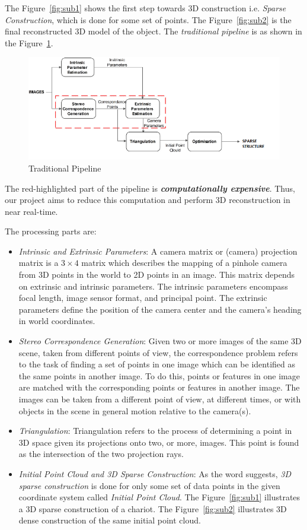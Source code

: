\documentclass{article}
\begin{document}
		The Figure~\ref{fig:sub1} shows the first step towards 3D construction i.e. \textit{Sparse Construction}, which is done for some set of points. The Figure~\ref{fig:sub2} is the final reconstructed 3D model of the object. The \textit{traditional pipeline} is as shown in the Figure~\ref{fig3}.

		\begin{figure}[ht!]
		\centering
		\includegraphics[width=14cm]{traditional_pipeline2.png}
		\caption{Traditional Pipeline\label{fig3}}
		\end{figure}

		The red-highlighted part of the pipeline is \textit{\textbf{computationally expensive}}. Thus, our project aims to reduce this computation and perform 3D reconstruction in near real-time.

		The processing parts are:
			\begin{itemize}
			\item \textit{Intrinsic and Extrinsic Parameters}: A camera matrix or (camera) projection matrix is a $3 \times 4$ matrix which describes the mapping of a pinhole camera from 3D points in the world to 2D points in an image. This matrix depends on extrinsic and intrinsic parameters. The intrinsic parameters encompass focal length, image sensor format, and principal point. The extrinsic parameters define the position of the camera center and the camera's heading in world coordinates. 
			\item \textit{Stereo Correspondence Generation}: Given two or more images of the same 3D scene, taken from different points of view, the correspondence problem refers to the task of finding a set of points in one image which can be identified as the same points in another image. To do this, points or features in one image are matched with the corresponding points or features in another image. The images can be taken from a different point of view, at different times, or with objects in the scene in general motion relative to the camera(s).
			\item \textit{Triangulation}: Triangulation refers to the process of determining a point in 3D space given its projections onto two, or more, images. This point is found as the intersection of the two projection rays.
			\item \textit{Initial Point Cloud and 3D Sparse Construction}: As the word suggests, \textit{3D sparse construction} is done for only some set of data points in the given coordinate system called \textit{Initial Point Cloud}. The Figure~\ref{fig:sub1} illustrates a 3D sparse construction of a chariot. The Figure~\ref{fig:sub2} illustrates 3D dense construction of the same initial point cloud.

			\end{itemize}
\end{document}
